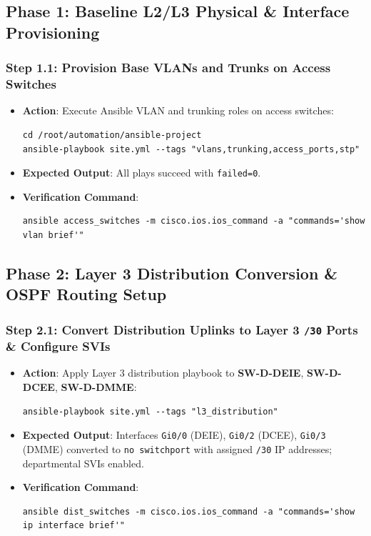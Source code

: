 \documentclass[11pt,a4paper]{article}
\newcommand{\hr}{\vspace{0.2cm}\noindent\hrulefill\vspace{0.2cm}}
\begin{document}
\subsection{Phase 1: Baseline L2/L3 Physical \& Interface Provisioning}

\subsubsection{Step 1.1: Provision Base VLANs and Trunks on Access Switches}
\begin{itemize}
    \item \textbf{Action}: Execute Ansible VLAN and trunking roles on access switches:
\begin{lstlisting}[style=bashstyle]
cd /root/automation/ansible-project
ansible-playbook site.yml --tags "vlans,trunking,access_ports,stp"
\end{lstlisting}
    \item \textbf{Expected Output}: All plays succeed with \texttt{failed=0}.
    \item \textbf{Verification Command}:
\begin{lstlisting}[style=bashstyle]
ansible access_switches -m cisco.ios.ios_command -a "commands='show vlan brief'"
\end{lstlisting}
\end{itemize}

\hr

\subsection{Phase 2: Layer 3 Distribution Conversion \& OSPF Routing Setup}

\subsubsection{Step 2.1: Convert Distribution Uplinks to Layer 3 \texttt{/30} Ports \& Configure SVIs}
\begin{itemize}
    \item \textbf{Action}: Apply Layer 3 distribution playbook to \textbf{SW-D-DEIE}, \textbf{SW-D-DCEE}, \textbf{SW-D-DMME}:
\begin{lstlisting}[style=bashstyle]
ansible-playbook site.yml --tags "l3_distribution"
\end{lstlisting}
    \item \textbf{Expected Output}: Interfaces \texttt{Gi0/0} (DEIE), \texttt{Gi0/2} (DCEE), \texttt{Gi0/3} (DMME) converted to \texttt{no switchport} with assigned \texttt{/30} IP addresses; departmental SVIs enabled.
    \item \textbf{Verification Command}:
\begin{lstlisting}[style=bashstyle]
ansible dist_switches -m cisco.ios.ios_command -a "commands='show ip interface brief'"
\end{lstlisting}
\end{itemize}
\end{document}
